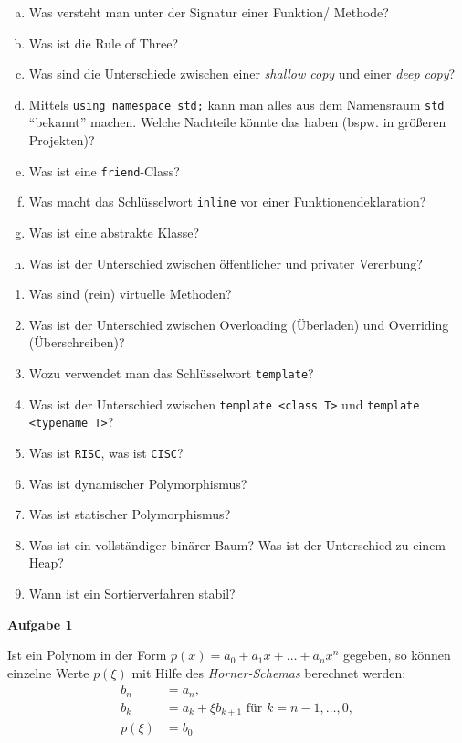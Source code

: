\documentclass[a4paper,12pt]{article}
\newcommand{\Aufgabe}[1]{
  {
    \vspace*{0.5cm}
    \textsf{\textbf{Aufgabe #1}}
    \vspace*{0.2cm}
    
  }
}
\begin{document}
\begin{enumerate}[a)]
\item Was versteht man unter der Signatur einer Funktion/ Methode?
\item Was ist die Rule of Three?
\item Was sind die Unterschiede zwischen einer \emph{shallow copy} und einer \emph{deep copy}?
\item Mittels \lstinline{using namespace std;} kann man alles aus dem Namensraum \lstinline{std} ``bekannt'' machen. Welche Nachteile könnte das haben (bspw. in größeren Projekten)?
\item Was ist eine \lstinline{friend}-Class?
\item Was macht das Schlüsselwort \lstinline{inline} vor einer Funktionendeklaration?
\item Was ist eine abstrakte Klasse?
\item Was ist der Unterschied zwischen öffentlicher und privater Vererbung?
\end{enumerate}
\begin{enumerate}[aa)]
\item Was sind (rein) virtuelle Methoden?
\item Was ist der Unterschied zwischen Overloading (Überladen) und Overriding (Überschreiben)?
\item Wozu verwendet man das Schlüsselwort \lstinline{template}?
\item Was ist der Unterschied zwischen \lstinline{template <class T>} und \lstinline{template <typename T>}?
\item Was ist \texttt{RISC}, was ist \texttt{CISC}?
\item Was ist dynamischer Polymorphismus?
\item Was ist statischer Polymorphismus?
\item Was ist ein vollständiger binärer Baum? Was ist der Unterschied zu einem Heap?
\item Wann ist ein Sortierverfahren stabil?
\end{enumerate}
\newpage
\Aufgabe{1} Ist ein Polynom in der Form
$p(x) = a_0 + a_1 x + \dots + a_nx^n$ gegeben, so können einzelne
Werte $p(\xi)$ mit Hilfe des \emph{Horner-Schemas} berechnet werden:
\begin{align*}
  b_n &= a_n, \\
  b_k &= a_k + \xi b_{k+1} \text{ für } k = n-1, \dots, 0, \\
  p(\xi) &= b_0
\end{align*}
\end{document}
